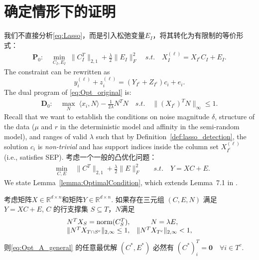 \documentclass{ctexart}
\begin{document}
\section{确定情形下的证明}\label{sec:proof_deterministic}

我们不直接分析\eqref{eq:Lasso}，而是引入松弛变量$E_I$，将其转化为有限制的等价形式：
\begin{align}\label{eq:Opt_original}
  \mathbf{P}_0:\quad \min_{C_I, E_I} \;
  \|C_I^T\|_{2,1}+\frac{\lambda}{2}\|E_I\|_F^2 \quad
  s.t. \quad X^{(\ell)}_I=X_{I^c}C_I+E_I.
\end{align}
The constraint can be rewritten as
\begin{equation}\label{eq:Opt_original_equi}
  y^{(\ell)}_i+z^{(\ell)}_i=(Y_{I^c}+Z_{I^c})c_i+e_i.
\end{equation}
The dual program of \eqref{eq:Opt_original} is:
\begin{equation}\label{eq:Opt_original_dual}
  \begin{aligned}
    \mathbf{D}_0:\quad \max_{N} \; \langle x_i,N \rangle - \frac{1}{2\lambda}N^TN \quad
    s.t. \quad \|(X_{I^c})^TN\|_{\infty} \leq 1.
  \end{aligned}
\end{equation}
Recall that we want to establish the conditions on noise magnitude $\delta$, structure of the data ($\mu$ and $r$ in the deterministic model and affinity in the semi-random model), and ranges of valid $\lambda$ such that by Definition~\ref{def:lasso_detection}, the solution $c_i$ is \emph{non-trivial} and has support indices inside the column set $X^{(\ell)}_{I^c}$ (i.e., satisfies SEP).
考虑一个一般的凸优化问题：
\begin{align}\label{eq:Opt_A_general}
  \quad \min_{C, E} \; &\|C^T\|_{2,1}+\frac{\lambda}{2}\|E\|^2_F \quad &s.t. \quad Y=XC+E.
\end{align}
We state Lemma~\ref{lemma:OptimalCondition}, which extends Lemma~7.1 in \cite{soltanolkotabi2011geometric}.
\begin{lemma}\label{lemma:OptimalCondition}
  考虑矩阵$X\in \mathbb{R}^{d\times n}$和矩阵$Y \in \mathbb{R}^{d\times n}$.
  如果存在三元组 $(C,E,N)$ 满足 $Y=XC+E$, $C$ 的行支撑集 $S\subseteq T$，$N$满足
  \begin{equation*}
    \begin{array}{cc}
      N^T X_S = \mathrm{norm}(C_S^T),  & N=\lambda E, \\
      \|N^T X_{T\cap S^{c}}\|_{2, \infty} \leq 1, & \|N^T X_{T^{c}}\|_{2, \infty}<1,
    \end{array}
  \end{equation*}
  则\eqref{eq:Opt_A_general} 的任意最优解 $(C^{*},E^{*})$ 必然有
  $(C^{*})^T_i=\mathbf{0} \quad \forall i \in T^c$.
\end{lemma}
\end{document}
